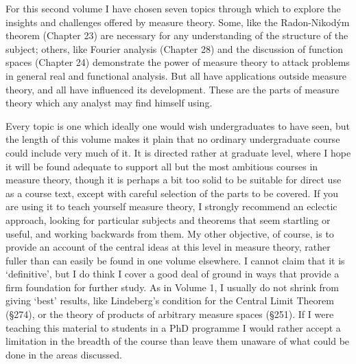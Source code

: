  
 
\medskip 
 
For this second volume I have chosen seven topics through which to 
explore the insights and challenges offered by measure theory.   Some, 
like the Radon-Nikod\'ym theorem (Chapter 23) are necessary for any 
understanding of the structure of the subject;   others, like Fourier 
analysis (Chapter 28) and the discussion of function spaces (Chapter 24) 
demonstrate the power of measure theory to attack problems in general 
real and functional analysis.   But all have applications outside 
measure theory, and all have influenced its development.   These are the 
parts of measure theory which any analyst may find himself using. 
 
Every topic is one which ideally one would wish undergraduates to have  
seen, but the length of this volume makes it plain that no ordinary  
undergraduate 
course could include very much of it.   It is directed rather at graduate  
level, where I hope it will be found adequate to support all but the most  
ambitious courses in measure theory, though it is perhaps a bit too solid  
to be suitable for direct 
use as a course text, except with careful selection of the parts to be 
covered.   If you are using it to teach yourself measure theory, I 
strongly recommend an eclectic approach, looking for particular subjects 
and theorems that seem startling or useful, and working backwards from 
them.   My other objective, of course, is to provide an account of the  
central ideas at this level in measure theory, rather fuller than can  
easily be found in one volume elsewhere.   I cannot claim that it is  
`definitive', but I do think I cover a good deal of ground in ways that 
provide a firm foundation for further study.   As in Volume 1, I usually 
do not shrink from giving `best' results, like Lindeberg's condition 
for the Central Limit Theorem (\S274), or the theory of products of 
arbitrary measure spaces (\S251).    
If I were teaching this material to students in a PhD programme 
I would rather accept a limitation in the breadth of the course than 
leave them unaware of what could be done in the areas discussed. 
 
